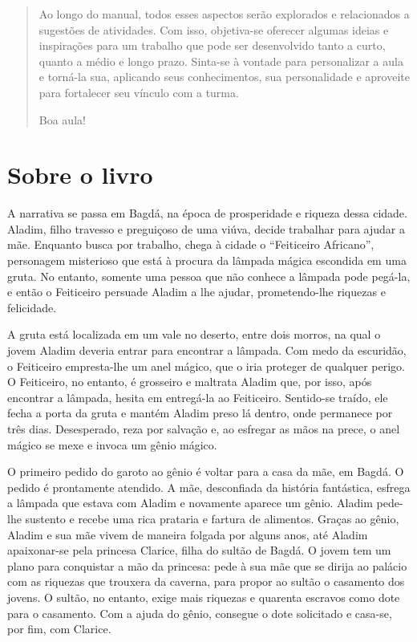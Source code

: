\documentclass[11pt]{extarticle}
\begin{document}
\begin{abstract}

Ao longo do manual, todos esses aspectos serão explorados e relacionados a sugestões de atividades. Com isso, objetiva-se oferecer algumas ideias e inspirações para um trabalho que pode ser desenvolvido tanto a curto, quanto a médio e longo prazo. Sinta-se à vontade para personalizar a aula e torná-la sua, aplicando seus conhecimentos, sua 
personalidade e aproveite para fortalecer seu vínculo com a turma.

Boa aula!

\end{abstract}

\section{Sobre o livro}
A narrativa se passa em Bagdá, na época de prosperidade e riqueza dessa cidade.
Aladim, filho travesso e preguiçoso de uma viúva, decide trabalhar para ajudar a mãe.
Enquanto busca por trabalho, chega à cidade o “Feiticeiro Africano”, personagem misterioso que está à procura da lâmpada mágica escondida em uma gruta. No entanto, somente uma pessoa que não conhece a lâmpada pode pegá-la, e então o Feiticeiro persuade Aladim a lhe ajudar, prometendo-lhe riquezas e felicidade.

A gruta está localizada em um vale no deserto, entre dois morros, na qual o jovem Aladim deveria entrar para encontrar a lâmpada. Com medo da escuridão, o Feiticeiro empresta-lhe um anel mágico, que o iria proteger de qualquer perigo. O Feiticeiro, no entanto, é grosseiro e maltrata Aladim que, por isso, após encontrar a lâmpada, hesita em entregá-la ao Feiticeiro. Sentido-se traído, ele fecha a porta da gruta e mantém Aladim preso lá dentro, onde permanece por três dias. Desesperado, reza por salvação e, ao esfregar as mãos na prece, o anel mágico se mexe e invoca um gênio mágico.

O primeiro pedido do garoto ao gênio é voltar para a casa da mãe, em Bagdá. O pedido é prontamente atendido. A mãe, desconfiada da história fantástica, esfrega a lâmpada que estava com Aladim e novamente aparece um gênio. Aladim pede-lhe sustento e recebe uma rica prataria e fartura de alimentos. Graças ao gênio, Aladim e sua mãe vivem de maneira folgada por alguns anos, até Aladim apaixonar-se pela princesa Clarice, filha do sultão de Bagdá. O jovem tem um plano para conquistar a mão da princesa: pede à sua mãe que se dirija ao palácio com as riquezas que trouxera da caverna, para propor ao sultão o casamento dos jovens. O sultão, no entanto, exige mais riquezas e quarenta escravos como dote para o casamento. Com a ajuda do gênio, consegue o dote solicitado e casa-se, por fim, com Clarice.
\end{document}
